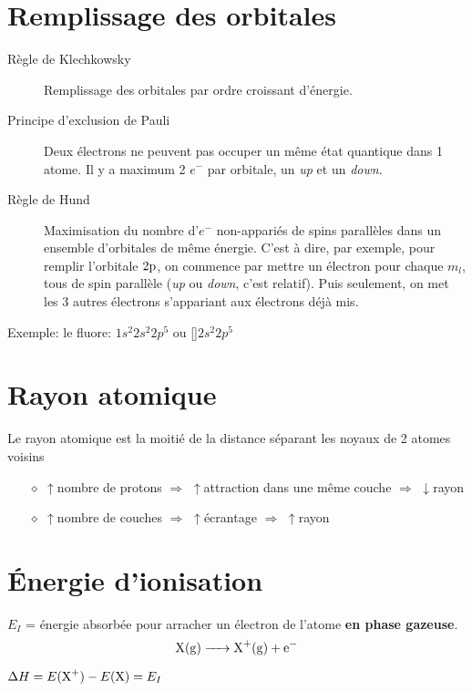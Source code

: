 \section{Remplissage des orbitales}
\begin{description}
	\item[Règle de Klechkowsky]
		Remplissage des orbitales par ordre croissant d'énergie.
	\item[Principe d'exclusion de Pauli]
		Deux électrons ne peuvent pas occuper un même état quantique dans 1 atome.
		Il y a maximum 2 $e^-$ par orbitale, un {\em up} et un {\em down}.
	\item[Règle de Hund]
		Maximisation du nombre d'$e^-$ non-appariés de spins parallèles dans un ensemble d'orbitales de même énergie.
		C'est à dire, par exemple, pour remplir l'orbitale $2\mathrm{p}$,
		on commence par mettre un électron pour chaque $m_l$, tous de spin parallèle
		({\em up} ou {\em down}, c'est relatif).
		Puis seulement, on met les 3 autres électrons s'appariant aux électrons déjà mis.
\end{description}

Exemple: le fluore:  $1s^2 2s^2 2p^5$ ou []$2s^2 2p^5$


\section{Rayon atomique}
Le rayon atomique est la moitié de la distance séparant les noyaux de 2 atomes voisins
\begin{itemize}
	\item[$\diamond$]$\uparrow$nombre de protons $\Rightarrow$ $\uparrow$attraction dans une même couche $\Rightarrow$  $\downarrow$rayon
	\item[$\diamond$]$\uparrow$nombre de couches $\Rightarrow$ $\uparrow$écrantage $\Rightarrow$ $\uparrow$rayon
\end{itemize}

\section{\'Energie d'ionisation}
\label{sec:ioni}

$E_I$ = énergie absorbée pour arracher un électron de l'atome \textbf{en phase gazeuse}.
$$\ce{X(g) -> X+(g) + e-}$$

$\Delta H = E(\ce{X^+})-E(\ce{X}) = E_I$

